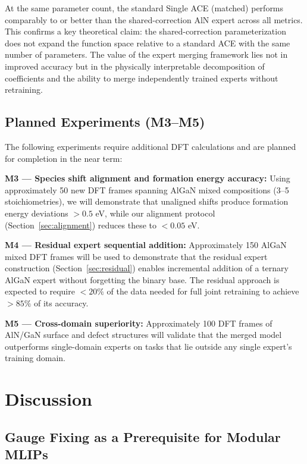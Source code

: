 \documentclass[twoside,prb,aps,floatfix,superscriptaddress,longbibliography]{revtex4-2}
\begin{document}
At the same parameter count, the standard Single ACE (matched) performs comparably to or better than the shared-correction AlN expert across all metrics. This confirms a key theoretical claim: the shared-correction parameterization does not expand the function space relative to a standard ACE with the same number of parameters. The value of the expert merging framework lies not in improved accuracy but in the physically interpretable decomposition of coefficients and the ability to merge independently trained experts without retraining.

\subsection{Planned Experiments (M3--M5)}

The following experiments require additional DFT calculations and are planned for completion in the near term:

\textbf{M3 --- Species shift alignment and formation energy accuracy:} Using approximately 50 new DFT frames spanning AlGaN mixed compositions (3--5 stoichiometries), we will demonstrate that unaligned shifts produce formation energy deviations $> 0.5$ eV, while our alignment protocol (Section~\ref{sec:alignment}) reduces these to $< 0.05$ eV.

\textbf{M4 --- Residual expert sequential addition:} Approximately 150 AlGaN mixed DFT frames will be used to demonstrate that the residual expert construction (Section~\ref{sec:residual}) enables incremental addition of a ternary AlGaN expert without forgetting the binary base. The residual approach is expected to require $< 20\%$ of the data needed for full joint retraining to achieve $> 85\%$ of its accuracy.

\textbf{M5 --- Cross-domain superiority:} Approximately 100 DFT frames of AlN/GaN surface and defect structures will validate that the merged model outperforms single-domain experts on tasks that lie outside any single expert's training domain.

\section{Discussion}
\label{sec:discussion}

\subsection{Gauge Fixing as a Prerequisite for Modular MLIPs}
\end{document}
